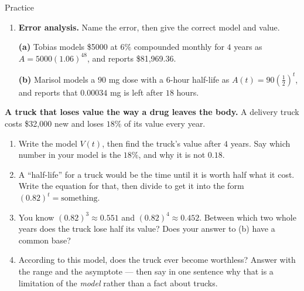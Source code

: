 \documentclass[10pt]{article}
\begin{document}
\begin{notesbox}{Practice}
\begin{enumerate}[leftmargin=1.9em, itemsep=11pt]
\begin{center}
\begin{minipage}[c]{0.52\linewidth}
    \vspace{3pt}
    \textbf{(b)} The money doubles between year \blank{1.0cm} and year \blank{1.0cm}.

    \vspace{3pt}
    \textbf{(c)} Write the equation you would have to solve to find the exact doubling time, then
    divide to simplify it. \blank{4.0cm}

    \vspace{3pt}
    \textbf{(d)} Try Step 1 of Lesson 7.3 on it. What stops you? \blank{4.0cm}
    \end{minipage}
    \end{center}

  \item \textbf{Error analysis.} Name the error, then give the correct model and value.

    \vspace{2pt}
    \textbf{(a)} Tobias models \$5000 at $6\%$ compounded monthly for $4$ years as
    $A=5000(1.06)^{48}$, and reports \$81{,}969.36. 

    \vspace{2pt}
    \textbf{(b)} Marisol models a $90$ mg dose with a $6$-hour half-life as
    $A(t)=90\left(\frac12\right)^{t}$, and reports that $0.00034$ mg is left after $18$ hours.
\end{enumerate}
\end{notesbox}

\begin{extensionbox}
\textbf{A truck that loses value the way a drug leaves the body.} A delivery truck costs \$32{,}000 new
and loses $18\%$ of its value every year.
\begin{enumerate}[label=(\alph*), leftmargin=1.8em, itemsep=5pt]
  \item Write the model $V(t)$, then find the truck's value after $4$ years. Say which number in your
        model is the $18\%$, and why it is not $0.18$.
  \item A ``half-life'' for a truck would be the time until it is worth half what it cost. Write the
        equation for that, then divide to get it into the form $(0.82)^{t}=\text{something}$.
  \item You know $(0.82)^{3}\approx0.551$ and $(0.82)^{4}\approx0.452$. Between which two whole years
        does the truck lose half its value? Does your answer to (b) have a common base?
  \item According to this model, does the truck ever become worthless? Answer with the range and the
        asymptote --- then say in one sentence why that is a limitation of the \emph{model} rather
        than a fact about trucks.
\end{enumerate}
\end{extensionbox}
\end{document}
